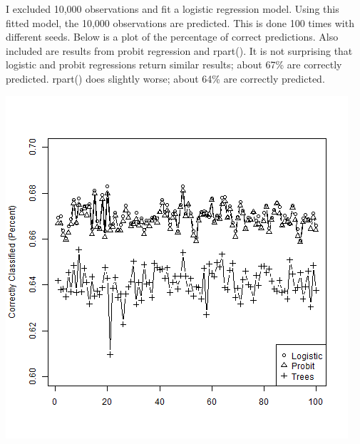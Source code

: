 \documentclass[12pt]{article}
\begin{document}
I excluded 10,000 observations and fit a logistic regression model. Using this fitted model, the 10,000 observations are predicted. This is done 100 times with different seeds. Below is a plot of the percentage of correct predictions. Also included are results from probit regression and rpart(). It is not surprising that logistic and probit regressions return similar results; about 67\% are correctly predicted. rpart() does slightly worse; about 64\% are correctly predicted.

\includegraphics[scale=.7]{this.png}
\end{document}
